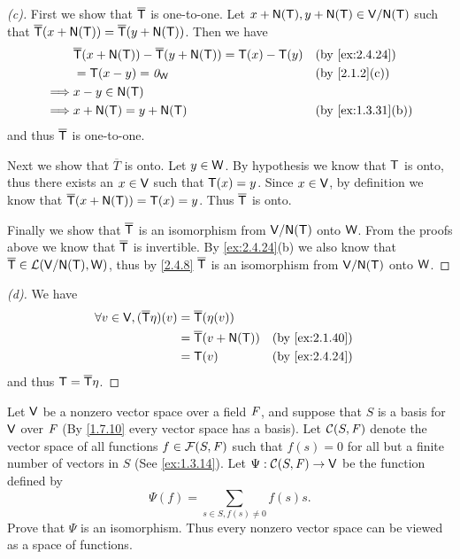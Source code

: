 \begin{proof}[(c)]
  First we show that \(\overline{\mathsf{T}}\) is one-to-one.
  Let \(x + \ns{\T}, y + \ns{\T} \in \V / \ns{\T}\) such that \(\overline{\T}(x + \ns{\T}) = \overline{\T}(y + \ns{\T})\).
  Then we have
  \begin{align*}
             & \overline{\T}(x + \ns{\T}) - \overline{\T}(y + \ns{\T}) = \T(x) - \T(y) &  & \by{ex:2.4.24}    \\
             & = \T(x - y) = \zv_{\W}                                                  &  & \by{2.1.2}[c]     \\
    \implies & x - y \in \ns{\T}                                                                              \\
    \implies & x + \ns{\T} = y + \ns{\T}                                               &  & \by{ex:1.3.31}[b]
  \end{align*}
  and thus \(\overline{\mathsf{T}}\) is one-to-one.

  Next we show that \(\overline{T}\) is onto.
  Let \(y \in \mathsf{W}\).
  By hypothesis we know that \(\mathsf{T}\) is onto, thus there exists an \(x \in \mathsf{V}\) such that \(\mathsf{T}(x) = y\).
  Since \(x \in \mathsf{V}\), by definition we know that \(\overline{\T}(x + \ns{\T}) = \T(x) = y\).
  Thus \(\overline{\mathsf{T}}\) is onto.

  Finally we show that \(\overline{\mathsf{T}}\) is an isomorphism from \(\V / \ns{\T}\) onto \(\mathsf{W}\).
  From the proofs above we know that \(\overline{\mathsf{T}}\) is invertible.
  By \cref{ex:2.4.24}(b) we also know that \(\overline{\T} \in \ls(\V / \ns{\T}, \W)\), thus by \cref{2.4.8} \(\overline{\mathsf{T}}\) is an isomorphism from \(\V / \ns{\T}\) onto \(\mathsf{W}\).
\end{proof}

\begin{proof}[(d)]
  We have
  \begin{align*}
    \forall v \in \V, (\overline{\T} \eta)(v) & = \overline{\T}(\eta(v))                         \\
                                              & = \overline{\T}(v + \ns{\T}) &  & \by{ex:2.1.40} \\
                                              & = \T(v)                      &  & \by{ex:2.4.24}
  \end{align*}
  and thus \(\mathsf{T} = \overline{\mathsf{T}} \eta\).
\end{proof}

\begin{ex}\label{ex:2.4.25}
  Let \(\mathsf{V}\) be a nonzero vector space over a field \(\mathit{F}\), and suppose that \(S\) is a basis for \(\mathsf{V}\) over \(\mathit{F}\)
  (By \cref{1.7.10} every vector space has a basis).
  Let \(\mathcal{C}(S, \mathit{F})\) denote the vector space of all functions \(f \in \mathcal{F}(S, \mathit{F})\) such that \(f(s) = 0\) for all but a finite number of vectors in \(S\)
  (See \cref{ex:1.3.14}).
  Let \(\Psi : \mathcal{C}(S, \mathit{F}) \to \mathsf{V}\) be the function defined by
  \[
    \Psi(f) = \sum_{s \in S, f(s) \neq 0} f(s) s.
  \]
  Prove that \(\Psi\) is an isomorphism.
  Thus every nonzero vector space can be viewed as a space of functions.
\end{ex}

